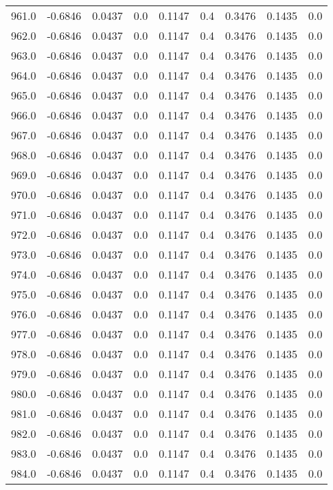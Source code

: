 \begin{longtable}{lrrrrrrrr}
961.0 & -0.6846 & 0.0437 & 0.0 & 0.1147 & 0.4 & 0.3476 & 0.1435 & 0.0 \\
962.0 & -0.6846 & 0.0437 & 0.0 & 0.1147 & 0.4 & 0.3476 & 0.1435 & 0.0 \\
963.0 & -0.6846 & 0.0437 & 0.0 & 0.1147 & 0.4 & 0.3476 & 0.1435 & 0.0 \\
964.0 & -0.6846 & 0.0437 & 0.0 & 0.1147 & 0.4 & 0.3476 & 0.1435 & 0.0 \\
965.0 & -0.6846 & 0.0437 & 0.0 & 0.1147 & 0.4 & 0.3476 & 0.1435 & 0.0 \\
966.0 & -0.6846 & 0.0437 & 0.0 & 0.1147 & 0.4 & 0.3476 & 0.1435 & 0.0 \\
967.0 & -0.6846 & 0.0437 & 0.0 & 0.1147 & 0.4 & 0.3476 & 0.1435 & 0.0 \\
968.0 & -0.6846 & 0.0437 & 0.0 & 0.1147 & 0.4 & 0.3476 & 0.1435 & 0.0 \\
969.0 & -0.6846 & 0.0437 & 0.0 & 0.1147 & 0.4 & 0.3476 & 0.1435 & 0.0 \\
970.0 & -0.6846 & 0.0437 & 0.0 & 0.1147 & 0.4 & 0.3476 & 0.1435 & 0.0 \\
971.0 & -0.6846 & 0.0437 & 0.0 & 0.1147 & 0.4 & 0.3476 & 0.1435 & 0.0 \\
972.0 & -0.6846 & 0.0437 & 0.0 & 0.1147 & 0.4 & 0.3476 & 0.1435 & 0.0 \\
973.0 & -0.6846 & 0.0437 & 0.0 & 0.1147 & 0.4 & 0.3476 & 0.1435 & 0.0 \\
974.0 & -0.6846 & 0.0437 & 0.0 & 0.1147 & 0.4 & 0.3476 & 0.1435 & 0.0 \\
975.0 & -0.6846 & 0.0437 & 0.0 & 0.1147 & 0.4 & 0.3476 & 0.1435 & 0.0 \\
976.0 & -0.6846 & 0.0437 & 0.0 & 0.1147 & 0.4 & 0.3476 & 0.1435 & 0.0 \\
977.0 & -0.6846 & 0.0437 & 0.0 & 0.1147 & 0.4 & 0.3476 & 0.1435 & 0.0 \\
978.0 & -0.6846 & 0.0437 & 0.0 & 0.1147 & 0.4 & 0.3476 & 0.1435 & 0.0 \\
979.0 & -0.6846 & 0.0437 & 0.0 & 0.1147 & 0.4 & 0.3476 & 0.1435 & 0.0 \\
980.0 & -0.6846 & 0.0437 & 0.0 & 0.1147 & 0.4 & 0.3476 & 0.1435 & 0.0 \\
981.0 & -0.6846 & 0.0437 & 0.0 & 0.1147 & 0.4 & 0.3476 & 0.1435 & 0.0 \\
982.0 & -0.6846 & 0.0437 & 0.0 & 0.1147 & 0.4 & 0.3476 & 0.1435 & 0.0 \\
983.0 & -0.6846 & 0.0437 & 0.0 & 0.1147 & 0.4 & 0.3476 & 0.1435 & 0.0 \\
984.0 & -0.6846 & 0.0437 & 0.0 & 0.1147 & 0.4 & 0.3476 & 0.1435 & 0.0 \\

\end{longtable}
